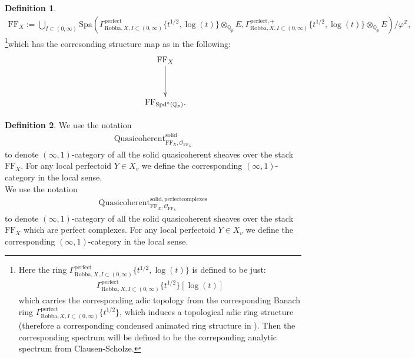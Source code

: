 \documentclass[12pt]{book}
\theoremstyle{definition}
\newtheorem{definition}{Definition}
\begin{document}
\begin{definition}
\begin{align}
\mathrm{FF}_X:=\bigcup_{I\subset (0,\infty)}\mathrm{Spa}(\Gamma^\text{perfect}_{\text{Robba},X,I\subset (0,\infty)}\{t^{1/2},\log(t)\}\otimes_{\mathbb{Q}_p}E,\Gamma^{\text{perfect},+}_{\text{Robba},X,I\subset (0,\infty)}\{t^{1/2},\log(t)\}\otimes_{\mathbb{Q}_p}E)/\varphi^\mathbb{Z},
\end{align}
\footnote{Here the ring $\Gamma^\text{perfect}_{\text{Robba},X,I\subset (0,\infty)}\{t^{1/2},\log(t)\}$ is defined to be just:
\begin{align}
\Gamma^\text{perfect}_{\text{Robba},X,I\subset (0,\infty)}\{t^{1/2}\}[\log(t)]
\end{align}
which carries the corresponding adic topology from the corresponding Banach ring 
$\Gamma^\text{perfect}_{\text{Robba},X,I\subset (0,\infty)}\{t^{1/2}\}$, which induces a topological adic ring structure (therefore a corresponding condensed animated ring structure in \cite{CS2}). Then the corresponding spectrum will be defined to be the correponding analytic spectrum from Clausen-Scholze.  
}which has the corresonding structure map as in the following:
\[\displayindent=-0.4in
\xymatrix@R+1pc{
&\mathrm{FF}_X  \ar[d] \\
&\mathrm{FF}_{\mathrm{Spd}^\diamond(\mathbb{Q}_p)}.  
}
\]
\end{definition}

\begin{definition}
We use the notation
\begin{align}
\mathrm{Quasicoherent}^{\mathrm{solid}}_{\mathrm{FF}_X,\mathcal{O}_{\mathrm{FF}_X}}
\end{align}
to denote $(\infty,1)$-category of all the solid quasicoherent sheaves over the stack $\mathrm{FF}_X$. For any local perfectoid $Y\in X_v$ we define the corresponding $(\infty,1)$-category in the local sense.\\
We use the notation
\begin{align}
\mathrm{Quasicoherent}^{\mathrm{solid,perfectcomplexes}}_{\mathrm{FF}_X,\mathcal{O}_{\mathrm{FF}_X}}
\end{align}
to denote $(\infty,1)$-category of all the solid quasicoherent sheaves over the stack $\mathrm{FF}_X$ which are perfect complexes. For any local perfectoid $Y\in X_v$ we define the corresponding $(\infty,1)$-category in the local sense.
\end{definition}
\end{document}

